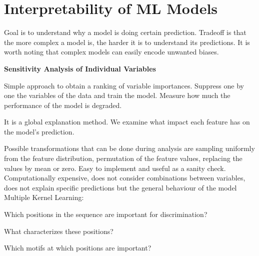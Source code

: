\documentclass[12pt]{article}
\begin{document}
\section{Interpretability of ML Models}
\par Goal is to understand why a model is doing certain prediction. Tradeoff is that the more complex a model is, the harder it is to understand its predictions. It is worth noting that complex models can easily encode unwanted biases.
\par \textbf{Sensitivity Analysis of Individual Variables}
\ulb
\item Simple approach to obtain a ranking of variable importances. Suppress one by one the variables of the data and train the model. Measure how much the performance of the model is degraded.
\item It is a global explanation method. We examine what impact each feature has on the model's prediction.
\item Possible transformations that can be done during analysis are sampling uniformly from the feature distribution, permutation of the feature values, replacing the values by mean or zero.
\pro Easy to implement and useful as a sanity check.
\con Computationally expensive, does not consider combinations between variables, does not explain specific predictions but the general behaviour of the model
\ule
Multiple Kernel Learning:
\ulb
\item Which positions in the sequence are important for discrimination?
\item What characterizes these positions?
\item Which motifs at which positions are important?
\ule
\end{document}
